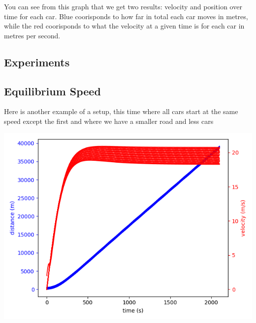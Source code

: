 \documentclass[11pt]{article}
\begin{document}
\begin{multicols}{2}
		\indent You can see from this graph that we get two results: velocity and position over time for each car. Blue coorisponds to how far in total each car moves in metres, while the red coorisponds
		to what the velocity at a given time is for each car in metres per second.

	\begin{center}

	\section*{Experiments}

		\subsection*{Equilibrium Speed}

	\end{center}

		\indent Here is another example of a setup, this time where all cars start at the same speed except the first and where we have a smaller road and less cars

		\includegraphics[scale = 0.5]{Figure_2.png}

	\end{multicols}
\end{document}

